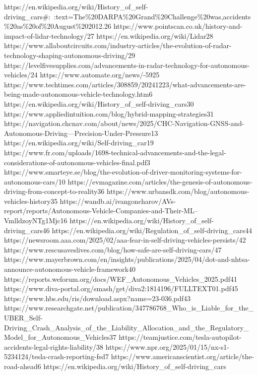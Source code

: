 https://en.wikipedia.org/wiki/History_of_self-driving_cars#:~:text=The\%20DARPA\%20Grand\%20Challenge\%20was,accidents\%20as\%20of\%20August\%202012.26 https://www.pointscan.co.uk/history-and-impact-of-lidar-technology/27 https://en.wikipedia.org/wiki/Lidar28 https://www.allaboutcircuits.com/industry-articles/the-evolution-of-radar-technology-shaping-autonomous-driving/29 https://levelfivesupplies.com/advancements-in-radar-technology-for-autonomous-vehicles/24 https://www.automate.org/news/-5925 https://www.techtimes.com/articles/308859/20241223/what-advancements-are-being-made-autonomous-vehicle-technology.htm6 https://en.wikipedia.org/wiki/History_of_self-driving_cars30 https://www.appliedintuition.com/blog/hybrid-mapping-strategies31 https://navigation.chcnav.com/about/news/2025/CHC-Navigation-GNSS-and-Autonomous-Driving---Precision-Under-Pressure13 https://en.wikipedia.org/wiki/Self-driving_car19 https://www.fr.com/uploads/1698-technical-advancements-and-the-legal-considerations-of-autonomous-vehicles-final.pdf3 https://www.smarteye.se/blog/the-evolution-of-driver-monitoring-systems-for-autonomous-cars/10 https://evmagazine.com/articles/the-genesis-of-autonomous-driving-from-concept-to-reality36 https://www.urbansdk.com/blog/autonomous-vehicles-history35 https://wandb.ai/ivangoncharov/AVs-report/reports/Autonomous-Vehicle-Companies-and-Their-ML--VmlldzoyNTg1Mjc16 https://en.wikipedia.org/wiki/History_of_self-driving_cars46 https://en.wikipedia.org/wiki/Regulation_of_self-driving_cars44 https://newsroom.aaa.com/2025/02/aaa-fear-in-self-driving-vehicles-persists/42 https://www.rescusaveslives.com/blog/how-safe-are-self-driving-cars/47 https://www.mayerbrown.com/en/insights/publications/2025/04/dot-and-nhtsa-announce-autonomous-vehicle-framework40 https://reports.weforum.org/docs/WEF_Autonomous_Vehicles_2025.pdf41 https://www.diva-portal.org/smash/get/diva2:1814196/FULLTEXT01.pdf45 https://www.hbs.edu/ris/download.aspx?name=23-036.pdf43 https://www.researchgate.net/publication/347786768_Who_is_Liable_for_the_UBER_Self-Driving_Crash_Analysis_of_the_Liability_Allocation_and_the_Regulatory_Model_for_Autonomous_Vehicles37 https://teamjustice.com/tesla-autopilot-accidents-legal-rights-liability/38 https://www.npr.org/2025/01/15/nx-s1-5234124/tesla-crash-reporting-fsd7 https://www.americanscientist.org/article/the-road-ahead6 https://en.wikipedia.org/wiki/History_of_self-driving_cars


